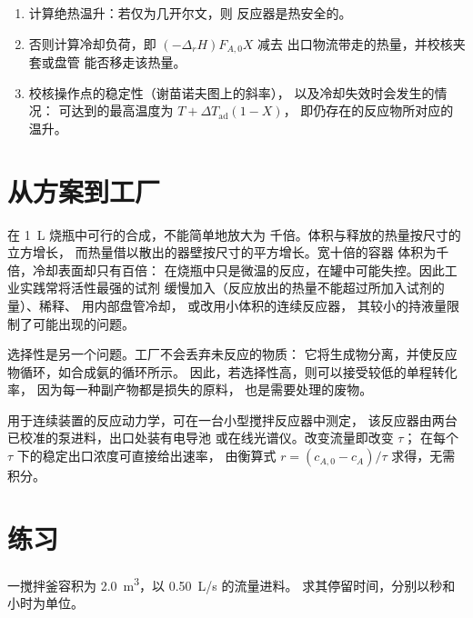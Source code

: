 \begin{method}[反应器的热量衡算]\label{met:b2:continuous-reactors:heat-balance}
\begin{enumerate}
  \item 计算绝热温升：若仅为几开尔文，则
        反应器是热安全的。
  \item 否则计算冷却负荷，即 $(-\Delta_r H)F_{A,0}X$ 减去
        出口物流带走的热量，并校核夹套或盘管
        能否移走该热量。
  \item 校核操作点的稳定性（谢苗诺夫图上的斜率），
        以及冷却失效时会发生的情况：
        可达到的最高温度为 $T + \Delta T_{\text{ad}}(1 - X)$，
        即仍存在的反应物所对应的温升。
\end{enumerate}
\end{method}

\section{从方案到工厂}

在 \qty{1}{L} 烧瓶中可行的合成，不能简单地放大为
千倍。体积与释放的热量按尺寸的立方增长，
而热量借以散出的器壁按尺寸的平方增长。宽十倍的容器
体积为千倍，冷却表面却只有百倍：
在烧瓶中只是微温的反应，在罐中可能失控。因此工业实践常将活性最强的试剂
缓慢加入（反应放出的热量不能超过所加入试剂的量）、稀释、
用内部盘管冷却，
或改用小体积的连续反应器，
其较小的持液量限制了可能出现的问题。

选择性是另一个问题。工厂不会丢弃未反应的物质：
它将生成物分离，并使反应物循环，如合成氨的循环所示。
因此，若选择性高，则可以接受较低的单程转化率，
因为每一种副产物都是损失的原料，
也是需要处理的废物。

\begin{inthelab}[实验台上的搅拌釜]
用于连续装置的反应动力学，可在一台小型搅拌反应器中测定，
该反应器由两台已校准的泵进料，出口处装有电导池
或在线光谱仪。改变流量即改变 $\tau$；
在每个 $\tau$ 下的稳定出口浓度可直接给出速率，
由衡算式 $r = (c_{A,0} - c_A)/\tau$ 求得，无需积分。
\end{inthelab}

\section{练习}

\begin{exercise}[$\star$]\label{exo:b2:continuous-reactors:1}
一搅拌釜容积为 \qty{2.0}{m^3}，以 \qty{0.50}{L/s} 的流量进料。
求其停留时间，分别以秒和小时为单位。
\end{exercise}

